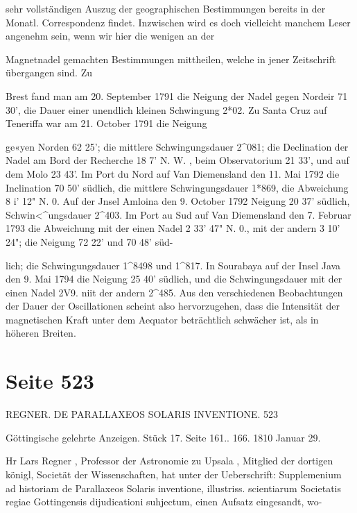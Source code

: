 \documentclass[10pt,a4paper]{article}
\begin{document}
sehr vollständigen Auszug der geographischen Bestimmungen bereits in der Monatl. Correspondenz findet. Inzwischen wird es doch vielleicht manchem Leser angenehm sein, wenn wir hier die wenigen an der

Magnetnadel gemachten Bestimmungen mittheilen, welche in jener Zeitschrift übergangen sind. Zu

Brest fand man am 20. September 1791 die Neigung der Nadel gegen Nordeir 71\textdegree{} 30', die Dauer einer unendlich kleinen Schwingung 2*02. Zu Santa Cruz auf Teneriffa war am 21. October 1791 die Neigung

ge«yen Norden 62\textdegree{} 25'; die mittlere Schwingungsdauer 2\textasciicircum{}081; die Declination der Nadel am Bord der Recherche 18\textdegree{} 7' N. W. , beim Observatorium 21\textdegree{} 33', und auf dem Molo 23\textdegree{} 43'. Im Port du Nord auf Van Diemensland den 11. Mai 1792 die Inclination 70\textdegree{} 50' südlich, die mittlere Schwingungsdauer 1*869, die Abweichung 8\textdegree{} i' 12" N. 0. Auf der Jnsel Amloina den 9. October 1792 Neigung 20\textdegree{} 37' südlich, Schwin<\textasciicircum{}ungsdauer 2\textasciicircum{}403. Im Port au Sud auf Van Diemensland den 7. Februar 1793 die Abweichung mit der einen Nadel 2\textdegree{} 33' 47" N. 0., mit der andern 3\textdegree{} 10' 24"; die Neigung 72\textdegree{} 22' und 70\textdegree{} 48' süd-

lich; die Schwingungsdauer 1\textasciicircum{}8498 und 1\textasciicircum{}817. In Sourabaya auf der Insel Java den 9. Mai 1794 die Neigung 25\textdegree{} 40' südlich, und die Schwingungsdauer mit der einen Nadel 2V9. niit der andern 2\textasciicircum{}485. Aus den verschiedenen Beobachtungen der Dauer der Oscillationen scheint also hervorzugehen, dass die Intensität der magnetischen Kraft unter dem Aequator beträchtlich schwächer ist, als in höheren Breiten.


\newpage
\section*{Seite 523}
REGNER. DE PARALLAXEOS SOLARIS INVENTIONE. 523

Göttingische gelehrte Anzeigen. Stück 17. Seite 161.. 166. 1810 Januar 29.

Hr Lars Regner , Professor der Astronomie zu Upsala , Mitglied der dortigen königl, Societät der Wissenschaften, hat unter der Ueberschrift: Supplemenium ad historiam de Parallaxeos Solaris inventione, illustriss. scientiarum Societatis regiae Gottingensis dijudicationi suhjectum, einen Aufsatz eingesandt, wo-
\end{document}
